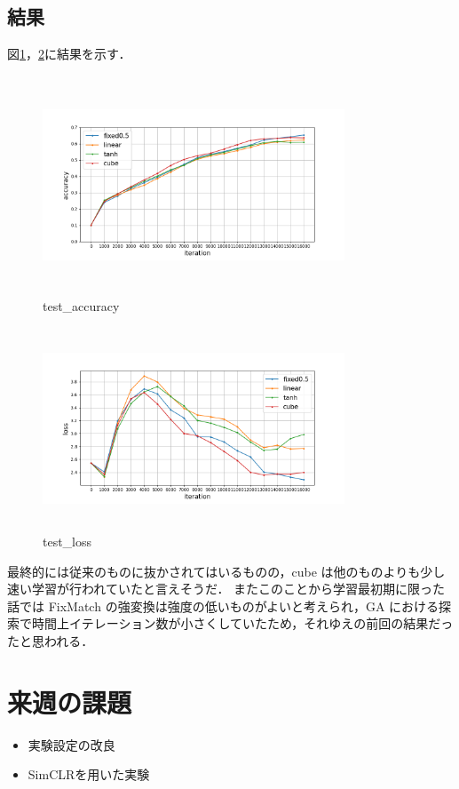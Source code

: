 \documentclass[twocolumn]{jarticle}     %
\begin{document}
\subsection{結果}
図\ref{fig:ex3_1}，\ref{fig:ex3_2}に結果を示す．
\begin{figure}[h]
	\begin{center}
		\vspace*{3mm}
		\hspace*{-12mm}
		\includegraphics[height=65mm,width=90mm]{acc_1.png}
		\caption{test\_accuracy\label{fig:ex3_1}}
	\end{center}
\end{figure}

\begin{figure}[h]
	\begin{center}
		\vspace*{3mm}
		\hspace*{-12mm}
		\includegraphics[height=60mm,width=90mm]{loss_1.png}
		\caption{test\_loss\label{fig:ex3_2}}
	\end{center}
\end{figure}

最終的には従来のものに抜かされてはいるものの，cube は他のものよりも少し速い学習が行われていたと言えそうだ．
またこのことから学習最初期に限った話では FixMatch の強変換は強度の低いものがよいと考えられ，GA における探索で時間上イテレーション数が小さくしていたため，それゆえの前回の結果だったと思われる．

\section{来週の課題}
\begin{itemize}
	\item 実験設定の改良
	\item SimCLRを用いた実験
\end{itemize}
\end{document}
